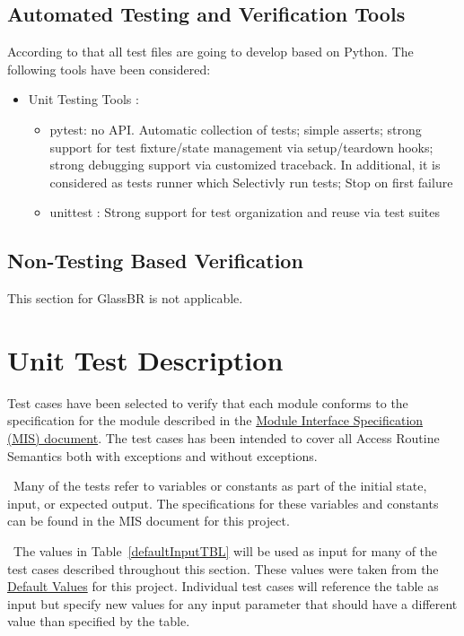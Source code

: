 \documentclass[12pt]{article}
\newcommand{\progname}{GlassBR}
\begin{document}
\subsection{Automated Testing and Verification Tools}
According to that all test files are going to develop based on Python. The following tools have been considered:
\begin{itemize}
	\item Unit Testing Tools :
	\begin{itemize}
		\item pytest:  no API. Automatic collection of tests; simple asserts; strong support for test fixture/state management via setup/teardown hooks; strong debugging support via customized traceback. In additional, it is considered as tests runner which Selectivly run tests; Stop on first failure 
		\item unittest : Strong support for test organization and reuse via test suites 
		 \end{itemize}
	 \end{itemize}


\subsection{Non-Testing Based Verification}
This section for \progname{} is not applicable.

\section{Unit Test Description}

\noindent Test cases have been selected to verify that each module conforms to 
the specification for the module described in the 
\href{https://github.com/smiths/caseStudies/blob/master/CaseStudies/glass/docs/Design/MIS/glassbr_mis.pdf}
{Module Interface Specification (MIS) document}. The test cases has been intended to cover all Access Routine Semantics both with exceptions and without exceptions. 

~\newline \noindent Many of the tests refer to variables or constants as part 
of the initial state, input, or expected output. The specifications for these 
variables and constants can be found in the MIS document for this project.

~\newline \noindent The values in Table~\ref{defaultInputTBL} will be used as input for 
many of the test cases described throughout this section. These values were 
taken from the \href{https://github.com/smiths/caseStudies/blob/master/CaseStudies/glass/src/Python/NewImplementation/TestFiles/defaultInputFile.txt} {Default Values} for this project. Individual 
test cases will reference the table as input but specify new values for any 
input parameter that should have a different value than specified by the table.
\end{document}
